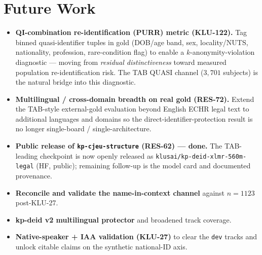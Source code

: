 \documentclass[11pt]{article}
\begin{document}
\section{Future Work}
\label{sec:futurework}
\begin{itemize}
  \item \textbf{QI-combination re-identification (PURR) metric (KLU-122).} Tag binned
        quasi-identifier tuples in gold (DOB/age band, sex, locality/NUTS, nationality, profession,
        rare-condition flag) to enable a $k$-anonymity-violation diagnostic --- moving from
        \emph{residual distinctiveness} toward measured population re-identification risk. The TAB
        QUASI channel ($3{,}701$ subjects) is the natural bridge into this diagnostic.
  \item \textbf{Multilingual / cross-domain breadth on real gold (RES-72).} Extend the TAB-style
        external-gold evaluation beyond English ECHR legal text to additional languages and domains
        so the direct-identifier-protection result is no longer single-board / single-architecture.
  \item \textbf{Public release of \texttt{kp-cjeu-structure} (RES-62) --- done.} The TAB-leading
        checkpoint is now openly released as \texttt{klusai/kp-deid-xlmr-560m-legal} (HF, public);
        remaining follow-up is the model card and documented provenance.
  \item \textbf{Reconcile and validate the name-in-context channel} against $n{=}1123$ post-KLU-27.
  \item \textbf{kp-deid v2 multilingual protector} and broadened track coverage.
  \item \textbf{Native-speaker + IAA validation (KLU-27)} to clear the \texttt{dev} tracks and unlock
        citable claims on the synthetic national-ID axis.
\end{itemize}



\end{document}
